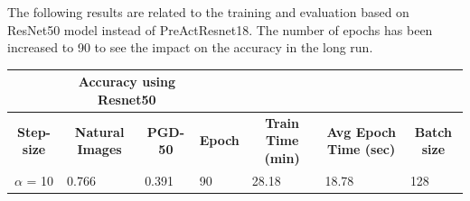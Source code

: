 \documentclass{article}
\begin{document}
The following results are related to the training and evaluation based on ResNet50 model instead of PreActResnet18. The number of epochs has been increased to 90 to see the impact on the accuracy in the long run. 

\begin{table}[hbt!]
\begin{tabular}{|c|c|l|l|l|l|l|}
\hline
\multicolumn{1}{|l|}{}    & \multicolumn{2}{c|}{\textbf{Accuracy using Resnet50}}                               & \multicolumn{4}{l|}{\textbf{}}                                                                                                                                                       \\ \hline
\textbf{Step-size}        & \textbf{Natural Images}                      & \multicolumn{1}{c|}{\textbf{PGD-50}} & \multicolumn{1}{c|}{\textbf{Epoch}} & \multicolumn{1}{c|}{\textbf{Train Time (min)}} & \multicolumn{1}{c|}{\textbf{Avg Epoch Time (sec)}} & \multicolumn{1}{c|}{\textbf{Batch size}} \\ \hline
$\alpha$ = 10 & \multicolumn{1}{l|}{0.766} & { 0.391}         & { 90}           & { 28.18}                   & { 18.78}                       & { 128}               \\ \hline
\end{tabular}
\end{table}
\end{document}
